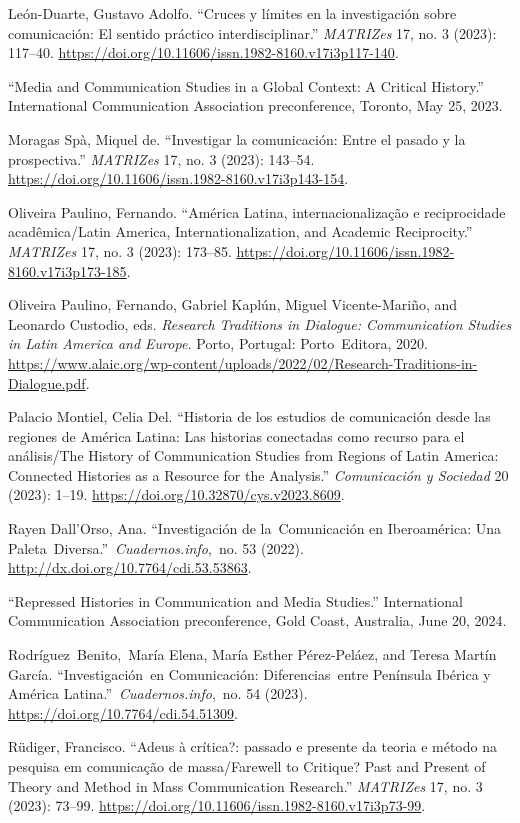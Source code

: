 \documentclass{tufte-handout}
\begin{document}
\begin{hangparas}{.25in}{1}
León-Duarte, Gustavo Adolfo. ``Cruces y límites en la investigación
sobre comunicación: El sentido práctico interdisciplinar.''
\emph{MATRIZes} 17, no. 3 (2023): 117--40.
\url{https://doi.org/10.11606/issn.1982-8160.v17i3p117-140}.

``Media and Communication Studies in a Global Context: A Critical
History.'' International Communication Association preconference,
Toronto, May 25, 2023.

Moragas Spà, Miquel de. ``Investigar la comunicación: Entre el pasado y
la prospectiva.'' \emph{MATRIZes} 17, no. 3 (2023): 143--54.
\url{https://doi.org/10.11606/issn.1982-8160.v17i3p143-154}.

Oliveira Paulino, Fernando. ``América Latina, internacionalização e
reciprocidade acadêmica/Latin America, Internationalization, and
Academic Reciprocity.'' \emph{MATRIZes} 17, no. 3 (2023): 173--85.
\url{https://doi.org/10.11606/issn.1982-8160.v17i3p173-185}.

Oliveira Paulino, Fernando, Gabriel Kaplún, Miguel Vicente-Mariño, and
Leonardo Custodio, eds. \emph{Research Traditions in Dialogue:
Communication Studies in Latin America and Europe.} Porto, Portugal:
Porto~Editora, 2020.
\url{https://www.alaic.org/wp-content/uploads/2022/02/Research-Traditions-in-Dialogue.pdf}.

Palacio Montiel, Celia Del. ``Historia de los estudios de comunicación
desde las regiones de América Latina: Las historias conectadas como
recurso para el análisis/The History of Communication Studies from
Regions of Latin America: Connected Histories as a Resource for the
Analysis.'' \emph{Comunicación y Sociedad} 20 (2023): 1--19.
\url{https://doi.org/10.32870/cys.v2023.8609}.

Rayen Dall'Orso, Ana. ``Investigación de la~Comunicación en
Iberoamérica: Una Paleta~Diversa.''~\emph{Cuadernos.info},\emph{~}no. 53
(2022). \url{http://dx.doi.org/10.7764/cdi.53.53863}.

``Repressed Histories in Communication and Media Studies.''
International Communication Association preconference, Gold Coast,
Australia, June 20, 2024.

Rodríguez~Benito,~María Elena, María Esther Pérez-Peláez, and Teresa
Martín García. ``Investigación~en Comunicación: Diferencias~entre
Península Ibérica y América Latina.''~\emph{Cuadernos.info},~no. 54
(2023). \url{https://doi.org/10.7764/cdi.54.51309}.

Rüdiger, Francisco. ``Adeus à crítica?: passado e presente da teoria e
método na pesquisa em comunicação de massa/Farewell to Critique? Past
and Present of Theory and Method in Mass Communication Research.''
\emph{MATRIZes} 17, no. 3 (2023): 73--99.
\url{https://doi.org/10.11606/issn.1982-8160.v17i3p73-99}.


\end{hangparas}
\end{document}
